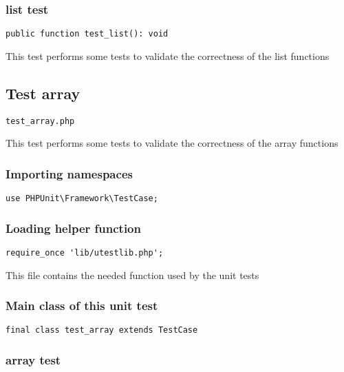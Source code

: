 \documentclass[a4paper]{article}
\begin{document}
\subsubsection{list test}

\begin{lstlisting}
public function test_list(): void
\end{lstlisting}

This test performs some tests to validate the correctness
of the list functions

\hypertarget{toc36}{}
\subsection{Test array}

\begin{lstlisting}
test_array.php
\end{lstlisting}

This test performs some tests to validate the correctness
of the array functions

\hypertarget{toc37}{}
\subsubsection{Importing namespaces}

\begin{lstlisting}
use PHPUnit\Framework\TestCase;
\end{lstlisting}

\hypertarget{toc38}{}
\subsubsection{Loading helper function}

\begin{lstlisting}
require_once 'lib/utestlib.php';
\end{lstlisting}

This file contains the needed function used by the unit tests

\hypertarget{toc39}{}
\subsubsection{Main class of this unit test}

\begin{lstlisting}
final class test_array extends TestCase
\end{lstlisting}

\hypertarget{toc40}{}
\subsubsection{array test}
\end{document}
